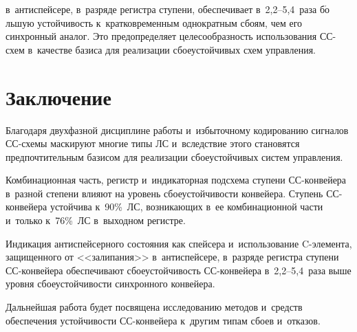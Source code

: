 \begin{multicols}{2}
\noindent 
в~антиспейсере, в~разряде регистра ступени, обес\-печивает в~2,2--5,4~раза 
б$\acute{\mbox{о}}$льшую устойчивость к~кратковременным однократным сбоям, чем его 
синхронный аналог. Это предопределяет целесообразность использования  
СС-схем в~качестве базиса для реализации сбоеустойчивых схем управления.
  
\section{Заключение}

  Благодаря двухфазной дисциплине работы и~избыточному кодированию 
сигналов СС-схе\-мы маскируют многие типы ЛС и~вследствие этого становятся 
предпочтительным базисом для реализации сбоеустойчивых систем 
управ\-ления.
  
  Комбинационная часть, регистр и~индикаторная подсхема ступени  
СС-кон\-вей\-ера в~разной степени влияют на уровень сбоеустойчивости 
конвейера. Ступень СС-кон\-вей\-ера устойчива к~90\%~ЛС, возникающих в~ее 
комбинационной части и~только к~76\%~ЛС в~выходном регистре. 
  
  Индикация антиспейсерного состояния как спейсера и~использование  
C-эле\-мен\-та, защищенного от <<залипания>> в~антиспейсере, в~разряде 
регистра ступени СС-кон\-вей\-ера обеспечивают сбоеустойчивость  
СС-кон\-вей\-ера в~2,2--5,4~раза выше уровня сбоеустойчивости синхронного 
конвейера.
  
  Дальнейшая работа будет посвящена исследованию методов и~средств 
обеспечения устойчивости СС-кон\-вей\-ера к~другим типам сбоев и~отказов.
  

\end{multicols}
